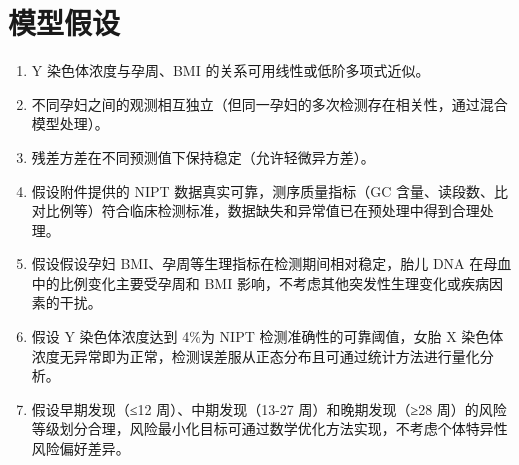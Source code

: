 \documentclass[withoutpreface,bwprint]{cumcmthesis} %
\begin{document}
\section{模型假设}
\begin{enumerate}
    \item Y 染色体浓度与孕周、BMI 的关系可用线性或低阶多项式近似。
    \item 不同孕妇之间的观测相互独立（但同一孕妇的多次检测存在相关性，通过混合模型处理）。
    \item 残差方差在不同预测值下保持稳定（允许轻微异方差）。
    \item 假设附件提供的 NIPT 数据真实可靠，测序质量指标（GC 含量、读段数、比对比例等）符合临床检测标准，数据缺失和异常值已在预处理中得到合理处理。
    \item 假设假设孕妇 BMI、孕周等生理指标在检测期间相对稳定，胎儿 DNA 在母血中的比例变化主要受孕周和 BMI 影响，不考虑其他突发性生理变化或疾病因素的干扰。
    \item 假设 Y 染色体浓度达到 4\%为 NIPT 检测准确性的可靠阈值，女胎 X 染色体浓度无异常即为正常，检测误差服从正态分布且可通过统计方法进行量化分析。
    \item 假设早期发现（≤12 周）、中期发现（13-27 周）和晚期发现（≥28 周）的风险等级划分合理，风险最小化目标可通过数学优化方法实现，不考虑个体特异性风险偏好差异。
\end{enumerate}

\end{document}
